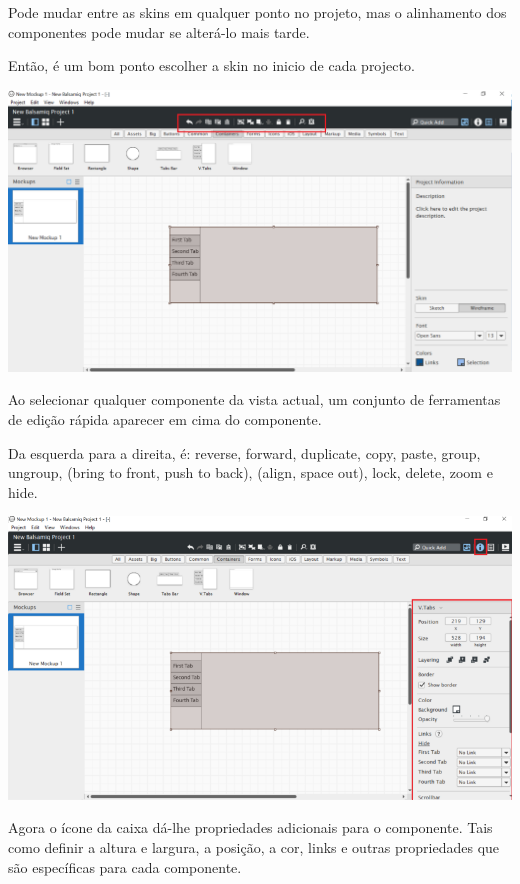 \documentclass{tufte-book} %
\begin{document}
Pode mudar entre as skins em qualquer ponto no projeto, mas o alinhamento dos componentes pode mudar se alterá-lo mais tarde.

Então, é um bom ponto escolher a skin no inicio de cada projecto.

\begin{center}
	\includegraphics{img8.png}
\end{center}

Ao selecionar qualquer componente da vista actual, um conjunto de ferramentas de edição rápida aparecer em cima do componente.

Da esquerda para a direita, é: reverse, forward, duplicate, copy, paste, group, ungroup, (bring to front, push to back), (align, space out), lock, delete, zoom e hide.

\begin{center}
	\includegraphics{img9.png}
\end{center}

Agora o ícone da caixa dá-lhe propriedades adicionais para o componente. Tais como definir a altura e largura, a posição, a cor, links e outras propriedades que são específicas para cada componente.
\end{document}
